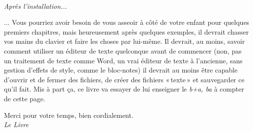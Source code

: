 \\


\textit{Après l'installation...}


... Vous pourriez avoir besoin de vous asseoir à côté de votre enfant pour quelques premiers chapitres, mais 
heureusement après quelques exemples, il devrait chasser vos mains du clavier et faire les choses par lui-même. 
Il devrait, au moins, savoir comment utiliser un éditeur de texte quelconque avant de commencer (non, pas un traitement de texte comme Word, un vrai éditeur de texte à l'ancienne, sans gestion d'effets de style, comme le bloc-notes) il devrait au moins être capable d'ouvrir et de fermer des fichiers, de créer des fichiers « texte » et sauvegarder ce qu'il fait. Mis à part ça, ce livre va essayer de lui enseigner le \textit{b+a, ba} à compter de cette page.

\bigskip
Merci pour votre temps, bien cordialement.\\


\textit{Le Livre}
